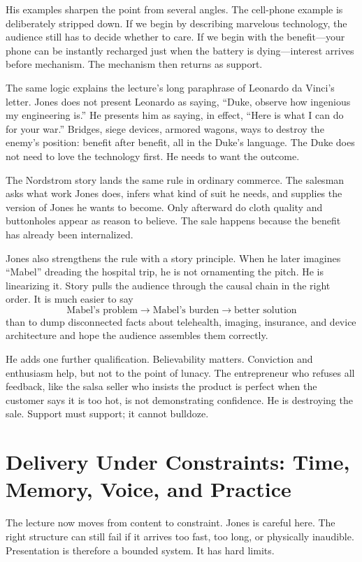His examples sharpen the point from several angles. The cell-phone example is deliberately stripped down. If we begin by describing marvelous technology, the audience still has to decide whether to care. If we begin with the benefit---your phone can be instantly recharged just when the battery is dying---interest arrives before mechanism. The mechanism then returns as support.

The same logic explains the lecture's long paraphrase of Leonardo da Vinci's letter. Jones does not present Leonardo as saying, ``Duke, observe how ingenious my engineering is.'' He presents him as saying, in effect, ``Here is what I can do for your war.'' Bridges, siege devices, armored wagons, ways to destroy the enemy's position: benefit after benefit, all in the Duke's language. The Duke does not need to love the technology first. He needs to want the outcome.

The Nordstrom story lands the same rule in ordinary commerce. The salesman asks what work Jones does, infers what kind of suit he needs, and supplies the version of Jones he wants to become. Only afterward do cloth quality and buttonholes appear as reason to believe. The sale happens because the benefit has already been internalized.

Jones also strengthens the rule with a story principle. When he later imagines ``Mabel'' dreading the hospital trip, he is not ornamenting the pitch. He is linearizing it. Story pulls the audience through the causal chain in the right order. It is much easier to say
\[
\text{Mabel's problem} \to \text{Mabel's burden} \to \text{better solution}
\]
than to dump disconnected facts about telehealth, imaging, insurance, and device architecture and hope the audience assembles them correctly.

He adds one further qualification. Believability matters. Conviction and enthusiasm help, but not to the point of lunacy. The entrepreneur who refuses all feedback, like the salsa seller who insists the product is perfect when the customer says it is too hot, is not demonstrating confidence. He is destroying the sale. Support must support; it cannot bulldoze.

\section{Delivery Under Constraints: Time, Memory, Voice, and Practice}

The lecture now moves from content to constraint. Jones is careful here. The right structure can still fail if it arrives too fast, too long, or physically inaudible. Presentation is therefore a bounded system. It has hard limits.

